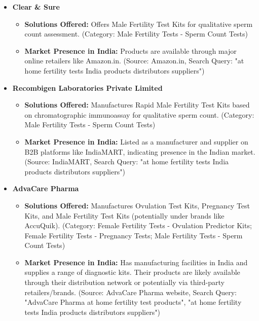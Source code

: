 \documentclass{article}
\begin{document}
\begin{itemize}[label=\textbullet]

    \item \textbf{Clear & Sure}
    \begin{itemize}[label=--]
        \item \textbf{Solutions Offered:} Offers Male Fertility Test Kits for qualitative sperm count assessment. (Category: Male Fertility Tests - Sperm Count Tests)
        \item \textbf{Market Presence in India:} Products are available through major online retailers like Amazon.in. (Source: Amazon.in, Search Query: "at home fertility tests India products distributors suppliers")
    \end{itemize}
    \vspace{0.5em} %

    \item \textbf{Recombigen Laboratories Private Limited}
    \begin{itemize}[label=--]
        \item \textbf{Solutions Offered:} Manufactures Rapid Male Fertility Test Kits based on chromatographic immunoassay for qualitative sperm count. (Category: Male Fertility Tests - Sperm Count Tests)
        \item \textbf{Market Presence in India:} Listed as a manufacturer and supplier on B2B platforms like IndiaMART, indicating presence in the Indian market. (Source: IndiaMART, Search Query: "at home fertility tests India products distributors suppliers")
    \end{itemize}
    \vspace{0.5em} %

    \item \textbf{AdvaCare Pharma}
    \begin{itemize}[label=--]
        \item \textbf{Solutions Offered:} Manufactures Ovulation Test Kits, Pregnancy Test Kits, and Male Fertility Test Kits (potentially under brands like AccuQuik\texttrademark). (Category: Female Fertility Tests - Ovulation Predictor Kits; Female Fertility Tests - Pregnancy Tests; Male Fertility Tests - Sperm Count Tests)
        \item \textbf{Market Presence in India:} Has manufacturing facilities in India and supplies a range of diagnostic kits. Their products are likely available through their distribution network or potentially via third-party retailers/brands. (Source: AdvaCare Pharma website, Search Query: "AdvaCare Pharma at home fertility test products", "at home fertility tests India products distributors suppliers")
    \end{itemize}
    \vspace{0.5em} %


\end{itemize}
\end{document}
